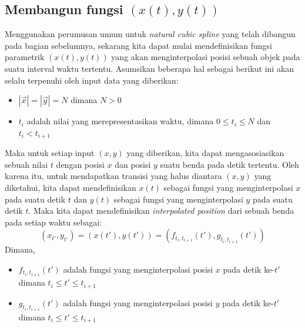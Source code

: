 \documentclass[journal,12pt,onecolumn,a4paper]{IEEEtran}
\begin{document}
\subsection{Membangun fungsi \((x(t), y(t))\)}
Menggunakan perumusan umum untuk \emph{natural cubic spline} yang telah dibangun pada bagian sebelumnya, sekarang kita dapat mulai mendefinisikan fungsi parametrik \((x(t), y(t))\) yang akan menginterpolasi posisi sebuah objek pada suatu interval waktu tertentu. Asumsikan beberapa hal sebagai berikut ini akan selalu terpenuhi oleh input data yang diberikan:
\begin{itemize}
	\item \(|\vec{x}| = |\vec{y}| = N\) dimana \(N > 0\)
	\item \(t_i\) adalah nilai yang merepresentasikan waktu, dimana \(0 \leq t_i \leq N\) dan \(t_i < t_{i+1}\)
\end{itemize}
Maka untuk setiap input \((x, y)\) yang diberikan, kita dapat mengasosiasikan sebuah nilai \(t\) dengan posisi \(x\) dan posisi \(y\) suatu benda pada detik tertentu. Oleh karena itu, untuk mendapatkan transisi yang halus diantara \((x, y)\) yang diketahui, kita dapat mendefinisikan \(x(t)\) sebagai fungsi yang menginterpolasi \(x\) pada suatu detik \(t\) dan \(y(t)\) sebagai fungsi yang menginterpolasi \(y\) pada suatu detik \(t\). Maka kita dapat mendefinisikan \emph{interpolated position} dari sebuah benda pada setiap waktu sebagai:
\begin{equation*}
	(x_{t'}, y_{t'}) = (x(t'), y(t')) = (f_{t_i, t_{i+1}}(t'), g_{t_i, t_{i+1}}(t'))
\end{equation*}
Dimana,
\begin{itemize}
	\item \(f_{t_i, t_{i+1}}(t')\) adalah fungsi yang menginterpolasi posisi \(x\) pada detik ke-\(t'\) dimana \(t_i \leq t' \leq t_{i+1}\)
	\item \(g_{t_i, t_{i+1}}(t')\) adalah fungsi yang menginterpolasi posisi \(y\) pada detik ke-\(t'\) dimana \(t_i \leq t' \leq t_{i+1}\)
\end{itemize}
\end{document}
